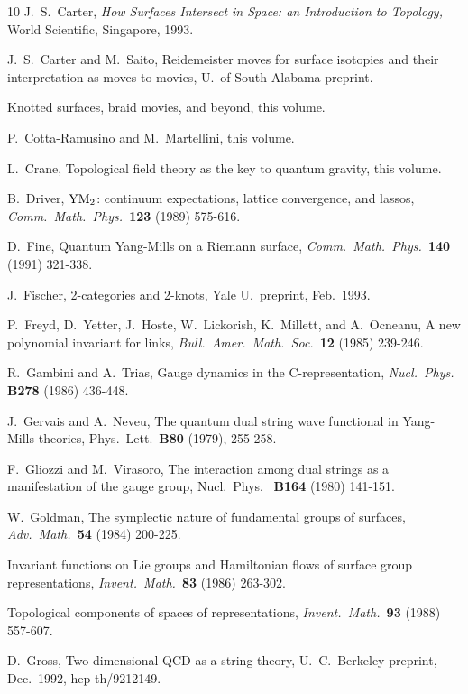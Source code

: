 \documentclass[12pt]{article}
\begin{document}
\begin{thebibliography} {10}
  J.\ S.\ Carter, {\sl How Surfaces Intersect in
Space: an Introduction to Topology,} World Scientific,
Singapore, 1993.

 J.\ S.\ Carter and M.\ Saito, Reidemeister
moves for surface isotopies and their interpretation as moves to movies,
U.\ of South Alabama preprint.

Knotted surfaces, braid movies, and beyond, this volume.

  P.\ Cotta-Ramusino and M.\ Martellini, this
volume.

  L.\ Crane, Topological field theory as the key to
quantum gravity, this volume.

 B.\ Driver, ${\rm YM_2}$: continuum expectations,
lattice convergence, and lassos, {\sl Comm.\ Math.\ Phys.\ }{\bf 123}
(1989) 575-616.

 D.\ Fine, Quantum Yang-Mills on a Riemann surface, {\sl
Comm.\ Math.\ Phys.\ }{\bf 140} (1991) 321-338.

  J.\ Fischer, 2-categories
and 2-knots, Yale U.\ preprint, Feb.\ 1993.

  P.\ Freyd, D.\ Yetter, J.\ Hoste,
W.\ Lickorish, K.\ Millett, and A.\ Ocneanu,
A new polynomial invariant for
links, {\sl Bull.\ Amer.\ Math.\ Soc.\ }{\bf 12} (1985) 239-246.

 R.\ Gambini and A.\ Trias, Gauge dynamics in the
C-representation, {\sl Nucl.\ Phys. }{\bf B278} (1986) 436-448.

 J.\ Gervais and A.\ Neveu, The quantum dual string wave
functional in Yang-Mills theories, Phys.\ Lett.\ {\bf B80}
(1979), 255-258.

 F.\ Gliozzi and M.\ Virasoro, The interaction among dual
strings as a manifestation of the gauge group, {Nucl.\ Phys.\ }{\bf
B164} (1980) 141-151.

 W.\ Goldman, The symplectic nature of fundamental
groups of surfaces, {\sl Adv.\ Math.\ }{\bf 54} (1984) 200-225.

Invariant functions on Lie groups and Hamiltonian flows of surface
group representations, {\sl Invent.\ Math.\ }{\bf 83} (1986) 263-302.

Topological components of spaces of representations, {\sl Invent.\
Math.\ }{\bf 93} (1988) 557-607.

 D.\ Gross, Two dimensional QCD as a string theory,
U.\ C.\ Berkeley preprint, Dec.\ 1992, hep-th/9212149.


\end{thebibliography}
\end{document}
